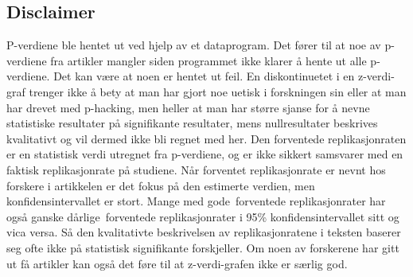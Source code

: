 \documentclass[doc,norsk]{apa7}
\begin{document}
\subsection{Disclaimer}
P-verdiene ble hentet ut ved hjelp av et dataprogram. Det fører til at noe av p-verdiene fra artikler mangler siden programmet ikke klarer å hente ut alle p-verdiene. Det kan være at noen er hentet ut feil. En diskontinuetet i en z-verdi-graf trenger ikke å bety at man har gjort noe uetisk i forskningen sin eller at man har drevet med p-hacking, men heller at man har større sjanse for å nevne statistiske resultater på signifikante resultater, mens nullresultater beskrives kvalitativt og vil dermed ikke bli regnet med her. Den forventede replikasjonraten er en statistisk verdi utregnet fra p-verdiene, og er ikke sikkert samsvarer med en faktisk replikasjonrate på studiene. Når forventet replikasjonrate er nevnt hos forskere i artikkelen er det fokus på den estimerte verdien, men konfidensintervallet er stort. Mange med \guillemetleft gode\guillemetright\ forventede replikasjonrater har også ganske \guillemetleft dårlige\guillemetright\ forventede replikasjonrater i 95\% konfidensintervallet sitt og vica versa. Så den kvalitativte beskrivelsen av replikasjonratene i teksten baserer seg ofte ikke på statistisk signifikante forskjeller. Om noen av forskerene har gitt ut få artikler kan også det føre til at z-verdi-grafen ikke er særlig god.

\printbibliography

\processdelayedfloats
\end{document}
